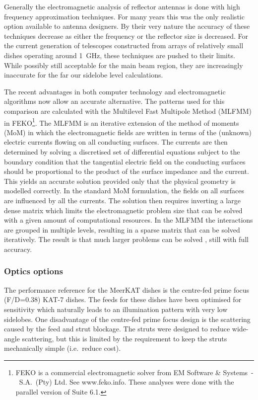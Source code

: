 \documentclass{aa}
\begin{document}
Generally the electromagnetic analysis of reflector antennas is done with high
frequency approximation techniques.  For many years this was the only realistic
option available to antenna designers.  By their very nature the accuracy of
these techniques decrease as either the frequency or the reflector size is
decreased.  For the current generation of telescopes constructed from arrays of
relatively small dishes operating around 1~GHz, these techniques are pushed to
their limits.  While possibly still acceptable for the main beam region, they
are increasingly inaccurate for the far our sidelobe level calculations.

The recent advantages in both computer technology and electromagnetic algorithms
now allow an accurate alternative.  The patterns used for this comparison are
calculated with the Multilevel Fast Multipole Method (MLFMM) in
FEKO\footnote{FEKO is a commercial electromagnetic solver from EM Software \&
  Systems~-~S.A.\ (Pty) Ltd.  See www.feko.info.  These analyses were done with
  the parallel version of Suite 6.1.}.  The MLFMM is an iterative extension of
the method of moments (MoM) in which the electromagnetic fields are written in
terms of the (unknown) electric currents flowing on all conducting surfaces. The
currents are then determined by solving a discretised set of differential
equations subject to the boundary condition that the tangential electric field
on the conducting surfaces should be proportional to the product of the surface
impedance and the current.  This yields an accurate solution provided only that
the physical geometry is modelled correctly.  In the standard MoM formulation,
the fields on all surfaces are influenced by all the currents.  The solution
then requires inverting a large dense matrix which limits the electromagnetic
problem size that can be solved with a given amount of computational resources.
In the MLFMM the interactions are grouped in multiple levels, resulting in a
sparse matrix that can be solved iteratively.  The result is that much larger
problems can be solved \citep{mlfmm,mlfmm-feko}, still with full accuracy.


\subsubsection{Optics options}
\label{sec:optics}

The performance reference for the MeerKAT dishes is the centre-fed prime focus
(F/D=0.38) KAT-7 dishes.  The feeds for these dishes have been optimised for
sensitivity which naturally leads to an illumination pattern with very low
sidelobes.  One disadvantage of the centre-fed prime focus design is the
scattering caused by the feed and strut blockage.  The struts were designed to
reduce wide-angle scattering, but this is limited by the requirement to keep the
struts mechanically simple (i.e.\ reduce cost).
\end{document}
